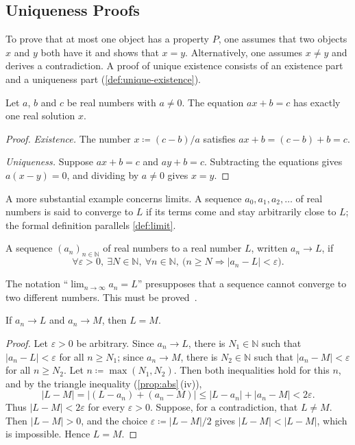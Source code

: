 \subsection{Uniqueness Proofs}

To prove that at most one object has a property $P$, one assumes that two objects $x$ and $y$ both have it and shows that $x=y$. Alternatively, one assumes $x\ne y$ and derives a contradiction. A proof of unique existence consists of an existence part and a uniqueness part (\cref{def:unique-existence}).

\begin{proposition}
\label{prop:linear-equation}
Let $a$, $b$ and $c$ be real numbers with $a\ne0$. The equation $ax+b=c$ has exactly one real solution $x$.
\end{proposition}

\begin{proof}
\emph{Existence.} The number $x\coloneqq(c-b)/a$ satisfies $ax+b=(c-b)+b=c$.

\emph{Uniqueness.} Suppose $ax+b=c$ and $ay+b=c$. Subtracting the equations gives $a(x-y)=0$, and dividing by $a\ne0$ gives $x=y$.
\end{proof}

A more substantial example concerns limits. A sequence $a_0,a_1,a_2,\ldots$ of real numbers is said to converge to $L$ if its terms come and stay arbitrarily close to $L$; the formal definition parallels \cref{def:limit}.

\begin{definition}
\label{def:sequence-limit}
A sequence $(a_n)_{n\in\mathbb N}$ of real numbers  to a real number $L$, written $a_n\to L$, if
\[
\forall\varepsilon>0,\ \exists N\in\mathbb N,\ \forall n\in\mathbb N,\ \bigl(n\ge N\Rightarrow|a_n-L|<\varepsilon\bigr).
\]
\end{definition}

The notation ``$\lim_{n\to\infty}a_n=L$'' presupposes that a sequence cannot converge to two different numbers. This must be proved~\cite{spivak2008calculus}.

\begin{theorem}
\label{thm:limit-unique}
If $a_n\to L$ and $a_n\to M$, then $L=M$.
\end{theorem}

\begin{proof}
Let $\varepsilon>0$ be arbitrary. Since $a_n\to L$, there is $N_1\in\mathbb N$ such that $|a_n-L|<\varepsilon$ for all $n\ge N_1$; since $a_n\to M$, there is $N_2\in\mathbb N$ such that $|a_n-M|<\varepsilon$ for all $n\ge N_2$. Let $n\coloneqq\max(N_1,N_2)$. Then both inequalities hold for this $n$, and by the triangle inequality (\cref{prop:abs}\,(iv)),
\[
|L-M|=|(L-a_n)+(a_n-M)|\le|L-a_n|+|a_n-M|<2\varepsilon .
\]
Thus $|L-M|<2\varepsilon$ for every $\varepsilon>0$. Suppose, for a contradiction, that $L\ne M$. Then $|L-M|>0$, and the choice $\varepsilon\coloneqq|L-M|/2$ gives $|L-M|<|L-M|$, which is impossible. Hence $L=M$.
\end{proof}

